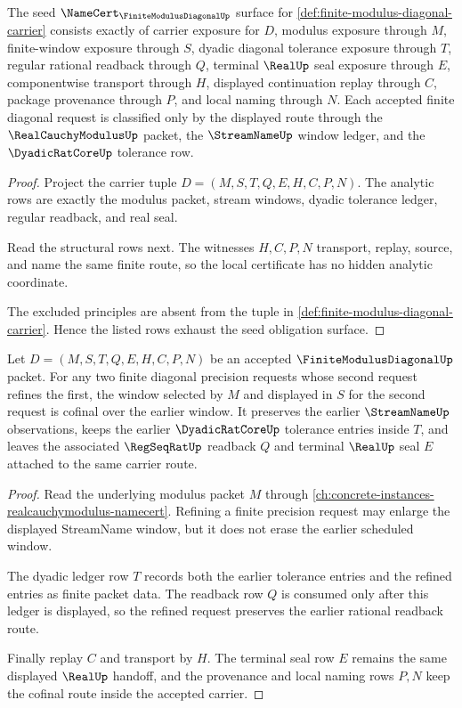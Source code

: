 \begin{theorem}
\label{thm:finite-modulus-diagonal-namecert-obligations}
The seed $\NameCert_{\FiniteModulusDiagonalUp}$ surface for \autoref{def:finite-modulus-diagonal-carrier} consists exactly of carrier exposure for $D$, modulus exposure through $M$, finite-window exposure through $S$, dyadic diagonal tolerance exposure through $T$, regular rational readback through $Q$, terminal $\RealUp$ seal exposure through $E$, componentwise transport through $H$, displayed continuation replay through $C$, package provenance through $P$, and local naming through $N$. Each accepted finite diagonal request is classified only by the displayed route through the $\RealCauchyModulusUp$ packet, the $\StreamNameUp$ window ledger, and the $\DyadicRatCoreUp$ tolerance row.
\end{theorem}
\begin{proof}
Project the carrier tuple $D=(M,S,T,Q,E,H,C,P,N)$. The analytic rows are exactly the modulus packet, stream windows, dyadic tolerance ledger, regular readback, and real seal.

Read the structural rows next. The witnesses $H,C,P,N$ transport, replay, source, and name the same finite route, so the local certificate has no hidden analytic coordinate.

The excluded principles are absent from the tuple in \autoref{def:finite-modulus-diagonal-carrier}. Hence the listed rows exhaust the seed obligation surface.
\end{proof}

\begin{theorem}
\label{thm:finite-modulus-diagonal-window-cofinality}
Let $D=(M,S,T,Q,E,H,C,P,N)$ be an accepted $\FiniteModulusDiagonalUp$ packet. For any two finite diagonal precision requests whose second request refines the first, the window selected by $M$ and displayed in $S$ for the second request is cofinal over the earlier window. It preserves the earlier $\StreamNameUp$ observations, keeps the earlier $\DyadicRatCoreUp$ tolerance entries inside $T$, and leaves the associated $\RegSeqRatUp$ readback $Q$ and terminal $\RealUp$ seal $E$ attached to the same carrier route.
\end{theorem}
\begin{proof}
Read the underlying modulus packet $M$ through \autoref{ch:concrete-instances-realcauchymodulus-namecert}. Refining a finite precision request may enlarge the displayed StreamName window, but it does not erase the earlier scheduled window.

The dyadic ledger row $T$ records both the earlier tolerance entries and the refined entries as finite packet data. The readback row $Q$ is consumed only after this ledger is displayed, so the refined request preserves the earlier rational readback route.

Finally replay $C$ and transport by $H$. The terminal seal row $E$ remains the same displayed $\RealUp$ handoff, and the provenance and local naming rows $P,N$ keep the cofinal route inside the accepted carrier.
\end{proof}

